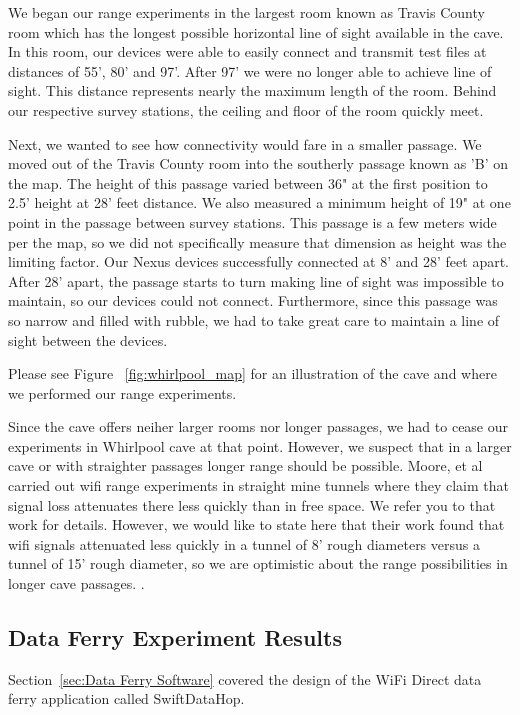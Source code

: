 \documentclass[10pt,twocolumn]{article}
\begin{document}
We began our range experiments in the largest room known as Travis County room which has the longest possible horizontal line of sight available in the cave.
In this room, our devices were able to easily connect and transmit test files at distances of 55', 80' and 97'. 
After 97' we were no longer able to achieve line of sight.
This distance represents nearly the maximum length of the room. 
Behind our respective survey stations, the ceiling and floor of the room quickly meet.

Next, we wanted to see how connectivity would fare in a smaller passage. 
We moved out of the Travis County room into the southerly passage known as 'B' on the map.
The height of this passage varied between 36" at the first position to 2.5' height at 28' feet distance.
We also measured a minimum height of 19" at one point in the passage between survey stations.
This passage is a few meters wide per the map, so we did not specifically measure that dimension as height was the limiting factor.
Our Nexus devices successfully connected at 8' and 28' feet apart.
After 28' apart, the passage starts to turn making line of sight was impossible to maintain, so our devices could not connect.
Furthermore, since this passage was so narrow and filled with rubble, we had to take great care to maintain a line of sight between the devices.

Please see Figure ~\ref{fig:whirlpool_map} for an illustration of the cave and where we performed our range experiments.


Since the cave offers neiher larger rooms nor longer passages, we had to cease our experiments in Whirlpool cave at that point.
However, we suspect that in a larger cave or with straighter passages longer range should be possible.
Moore, et al carried out wifi range experiments in straight mine tunnels where they claim that signal loss attenuates there less quickly than in free space.
We refer you to that work for details.
However, we would like to state here that their work found that wifi signals attenuated less quickly in a tunnel of 8' rough diameters versus a tunnel of 15' rough diameter, so we are optimistic about the range possibilities in longer cave passages. \cite{moore2012}.


\subsection{Data Ferry Experiment Results}
\label{sec:Data Ferry Experiment Results}
Section~\ref{sec:Data Ferry Software} covered the design of the WiFi Direct data ferry application called SwiftDataHop. 
\end{document}

